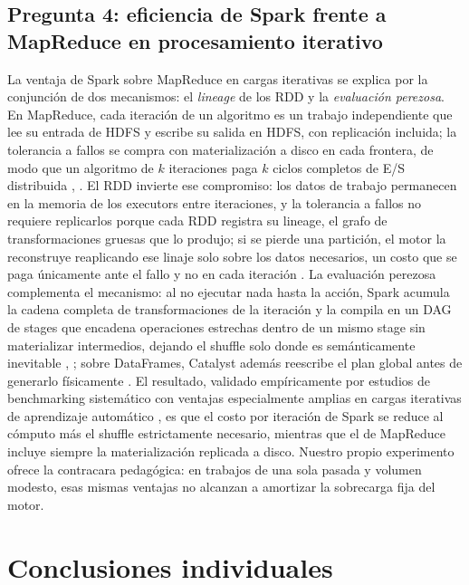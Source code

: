 \documentclass[10pt,journal]{IEEEtran}
\begin{document}
\subsection{Pregunta 4: eficiencia de Spark frente a MapReduce en procesamiento iterativo}
La ventaja de Spark sobre MapReduce en cargas iterativas se explica por la
conjunci\'on de dos mecanismos: el \emph{lineage} de los RDD y la
\emph{evaluaci\'on perezosa}. En MapReduce, cada iteraci\'on de un algoritmo es
un trabajo independiente que lee su entrada de HDFS y escribe su salida en
HDFS, con replicaci\'on incluida; la tolerancia a fallos se compra con
materializaci\'on a disco en cada frontera, de modo que un algoritmo de $k$
iteraciones paga $k$ ciclos completos de E/S distribuida \cite{dean2008},
\cite{shvachko2010}. El RDD invierte ese compromiso: los datos de trabajo
permanecen en la memoria de los executors entre iteraciones, y la tolerancia a
fallos no requiere replicarlos porque cada RDD registra su lineage, el grafo de
transformaciones gruesas que lo produjo; si se pierde una partici\'on, el motor
la reconstruye reaplicando ese linaje solo sobre los datos necesarios, un costo
que se paga \'unicamente ante el fallo y no en cada iteraci\'on
\cite{zaharia2016}. La evaluaci\'on perezosa complementa el mecanismo: al no
ejecutar nada hasta la acci\'on, Spark acumula la cadena completa de
transformaciones de la iteraci\'on y la compila en un DAG de stages que
encadena operaciones estrechas dentro de un mismo stage sin materializar
intermedios, dejando el shuffle solo donde es sem\'anticamente inevitable
\cite{zaharia2016}, \cite{armbrust2015}; sobre DataFrames, Catalyst adem\'as
reescribe el plan global antes de generarlo f\'isicamente \cite{armbrust2015}.
El resultado, validado emp\'iricamente por estudios de benchmarking
sistem\'atico con ventajas especialmente amplias en cargas iterativas de
aprendizaje autom\'atico \cite{ahmed2020}, es que el costo por iteraci\'on de
Spark se reduce al c\'omputo m\'as el shuffle estrictamente necesario, mientras
que el de MapReduce incluye siempre la materializaci\'on replicada a disco.
Nuestro propio experimento ofrece la contracara pedag\'ogica: en trabajos de
una sola pasada y volumen modesto, esas mismas ventajas no alcanzan a
amortizar la sobrecarga fija del motor.

\section{Conclusiones individuales}
\label{sec:conclusiones}
\end{document}
